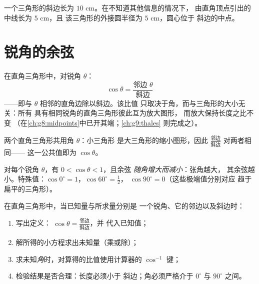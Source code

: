 \begin{example}\label{ex:g8:cosine:circle}
一个三角形的斜边长为 $10$ cm。在不知道其他信息的情况下，
由直角顶点引出的中线长为 $5$ cm，且
该三角形的外接圆半径为 $5$ cm，圆心位于
斜边的中点。
\end{example}

\section{锐角的余弦}

\begin{definition}[余弦]\label{def:g8:cosine:def}
在直角三角形中，对锐角 $\theta$：
\[
\cos\theta = \frac{\text{邻边 } \theta}{\text{斜边}}
\]
——即与 $\theta$ 相邻的直角边除以斜边。该比值
只取决于角，而与三角形的大小无关：所有
具有相同锐角的直角三角形彼此互为放大图形，
而放大保持长度之比不变
（在\cref{ch:g8:midpoints}中已开其端；\cref{ch:g9:thales}
则完成之）。
\end{definition}

\begin{omfigure}

{\small 两个直角三角形共用角 $\theta$：小三角形
是大三角形的缩小图形，因此
$\frac{\text{邻边}}{\text{斜边}}$ 对两者相同——
这一公共值即为 $\cos\theta$。}
\end{omfigure}

\begin{proposition}[初值与界]\label{prop:g8:cosine:bounds}
对每个锐角 $\theta$，有 $0 < \cos\theta < 1$，且余弦
\emph{随角增大而减小}：张角越大，
其余弦越小。特殊值：$\cos 0^\circ = 1$，$\cos 60^\circ = \frac12$，
$\cos 90^\circ = 0$（这些极端值分别对应
趋于扁平的三角形）。
\end{proposition}
\admitted

\begin{method}[利用余弦]\label{met:g8:cosine:use}
在直角三角形中，当已知量与所求量分别是
一个锐角、它的邻边以及斜边时：
\begin{enumerate}
  \item 写出定义：
        $\cos\theta = \frac{\text{邻边}}{\text{斜边}}$，并
        代入已知值；
  \item 解所得的小方程求出未知量（乘或除）；
  \item 求未知\emph{角}时，对算得的比值使用计算器的
        $\cos^{-1}$ 键；
  \item 检验结果是否合理：长度必须小于
        斜边；角必须严格介于 $0^\circ$ 与
        $90^\circ$ 之间。
\end{enumerate}
\end{method}

